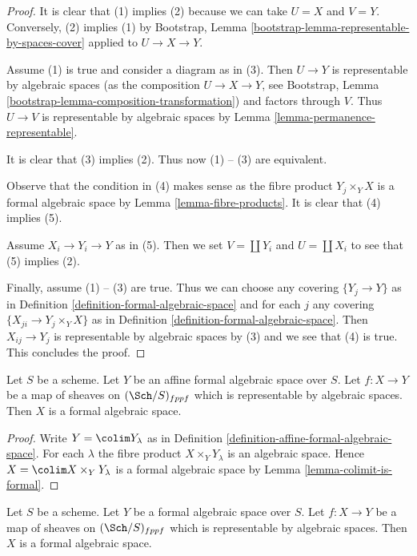 \begin{proof}
It is clear that (1) implies (2) because we can take $U = X$ and $V = Y$.
Conversely, (2) implies (1) by
Bootstrap, Lemma \ref{bootstrap-lemma-representable-by-spaces-cover}
applied to $U \to X \to Y$.

\medskip\noindent
Assume (1) is true and consider a diagram as in (3).
Then $U \to Y$ is representable by algebraic spaces
(as the composition $U \to X \to Y$, see
Bootstrap, Lemma \ref{bootstrap-lemma-composition-transformation})
and factors through $V$. Thus $U \to V$ is representable by
algebraic spaces by Lemma \ref{lemma-permanence-representable}.

\medskip\noindent
It is clear that (3) implies (2). Thus now (1) -- (3) are equivalent.

\medskip\noindent
Observe that the condition in (4) makes sense as the fibre product
$Y_j \times_Y X$ is a formal algebraic space by
Lemma \ref{lemma-fibre-products}.
It is clear that (4) implies (5).

\medskip\noindent
Assume $X_i \to Y_i \to Y$ as in (5). Then we set
$V = \coprod Y_i$ and $U = \coprod X_i$ to see that
(5) implies (2).

\medskip\noindent
Finally, assume (1) -- (3) are true.
Thus we can choose any covering $\{Y_j \to Y\}$ as in
Definition \ref{definition-formal-algebraic-space}
and for each $j$ any covering $\{X_{ji} \to Y_j \times_Y X\}$ as in
Definition \ref{definition-formal-algebraic-space}.
Then $X_{ij} \to Y_j$ is representable by algebraic spaces by (3)
and we see that (4) is true. This concludes the proof.
\end{proof}

\begin{lemma}
\label{lemma-algebraic-space-over-affine-formal}
Let $S$ be a scheme. Let $Y$ be an affine formal algebraic space over $S$.
Let $f : X \to Y$ be a map of sheaves on $(\Sch/S)_{fppf}$ which is
representable by algebraic spaces. Then $X$ is a formal
algebraic space.
\end{lemma}

\begin{proof}
Write $Y = \colim Y_\lambda$ as in
Definition \ref{definition-affine-formal-algebraic-space}.
For each $\lambda$ the fibre product
$X \times_Y Y_\lambda$ is an algebraic space.
Hence $X = \colim X \times_Y Y_\lambda$ is a formal
algebraic space by Lemma \ref{lemma-colimit-is-formal}.
\end{proof}

\begin{lemma}
\label{lemma-representable-by-algebraic-spaces}
Let $S$ be a scheme. Let $Y$ be a formal algebraic space over $S$.
Let $f : X \to Y$ be a map of sheaves on $(\Sch/S)_{fppf}$ which is
representable by algebraic spaces. Then $X$ is a formal
algebraic space.
\end{lemma}

